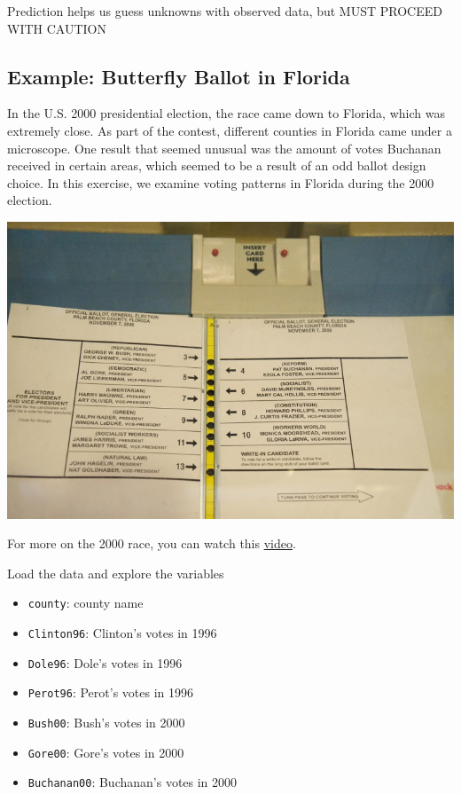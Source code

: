 \documentclass[
  letterpaper,
  DIV=11,
  numbers=noendperiod]{scrreprt}
\providecommand{\tightlist}{%
  \setlength{\itemsep}{0pt}\setlength{\parskip}{0pt}}\usepackage{longtable,booktabs,array}
\begin{document}
Prediction helps us guess unknowns with observed data, but MUST PROCEED
WITH CAUTION

\hypertarget{example-butterfly-ballot-in-florida}{%
\subsection{Example: Butterfly Ballot in
Florida}\label{example-butterfly-ballot-in-florida}}

In the U.S. 2000 presidential election, the race came down to Florida,
which was extremely close. As part of the contest, different counties in
Florida came under a microscope. One result that seemed unusual was the
amount of votes Buchanan received in certain areas, which seemed to be a
result of an odd ballot design choice. In this exercise, we examine
voting patterns in Florida during the 2000 election.

\includegraphics{images/chad.jpg}

For more on the 2000 race, you can watch this
\href{https://www.youtube.com/watch?v=D-nR_hmS6V0\&ab_channel=HISTORY}{video}.

Load the data and explore the variables

\begin{itemize}
\tightlist
\item
  \texttt{county}: county name
\item
  \texttt{Clinton96}: Clinton's votes in 1996
\item
  \texttt{Dole96}: Dole's votes in 1996
\item
  \texttt{Perot96}: Perot's votes in 1996
\item
  \texttt{Bush00}: Bush's votes in 2000
\item
  \texttt{Gore00}: Gore's votes in 2000
\item
  \texttt{Buchanan00}: Buchanan's votes in 2000
\end{itemize}
\end{document}
